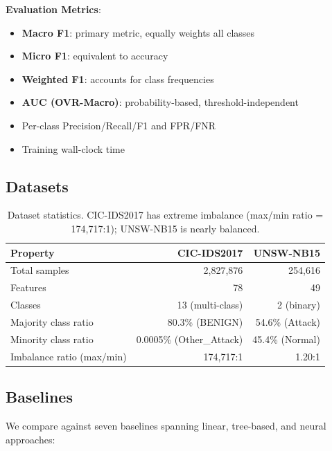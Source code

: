\documentclass[12pt]{article}
\begin{document}
\textbf{Evaluation Metrics}:
\begin{itemize}
    \item \textbf{Macro F1}: primary metric, equally weights all classes
    \item \textbf{Micro F1}: equivalent to accuracy
    \item \textbf{Weighted F1}: accounts for class frequencies
    \item \textbf{AUC (OVR-Macro)}: probability-based, threshold-independent
    \item Per-class Precision/Recall/F1 and FPR/FNR
    \item Training wall-clock time
\end{itemize}

\subsection{Datasets}
\label{subsec:datasets}

\begin{table}[t]
\centering
\caption{Dataset statistics. CIC-IDS2017 has extreme imbalance (max/min ratio = 174,717:1); UNSW-NB15 is nearly balanced.}
\label{tab:datasets}
\begin{tabular}{lrr}
\toprule
\textbf{Property} & \textbf{CIC-IDS2017} & \textbf{UNSW-NB15} \\
\midrule
Total samples & 2,827,876 & 254,616 \\
Features & 78 & 49 \\
Classes & 13 (multi-class) & 2 (binary) \\
Majority class ratio & 80.3\% (BENIGN) & 54.6\% (Attack) \\
Minority class ratio & 0.0005\% (Other\_Attack) & 45.4\% (Normal) \\
Imbalance ratio (max/min) & 174,717:1 & 1.20:1 \\
\bottomrule
\end{tabular}
\end{table}

\subsection{Baselines}
\label{subsec:baselines}

We compare against seven baselines spanning linear, tree-based, and neural approaches:
\end{document}
